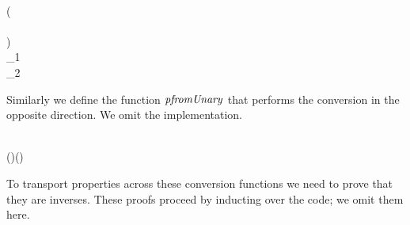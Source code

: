 \begin{hscode}
\\
\>[39]{}(\lambda {}\to {}\;\;\<[E]%
\\
\>[39]{}\<[42]%
\>[42]{}\;\<[51]%
\>[51]{}\to {}\;\<[E]%
\\
\>[39]{}\<[42]%
\>[42]{}\;\<[51]%
\>[51]{}\to {}\;){}\<[E]%
\\
\>[3]{}\<[5]%
\>[5]{}\;{}\<[12]%
\>[12]{}\;_1\;\mathrel{=}\;\;\<[E]%
\\
\>[12]{}\;_2\;\mathrel{=}\;\;\<[E]%
\ColumnHook
\end{hscode}\resethooks
Similarly we define the function \ensuremath{\Varid{pfromUnary}} that performs the conversion
in the opposite direction. We omit the implementation.
\begin{hscode}\SaveRestoreHook
{}%
%
%
%
\>[3]{}\mathbin{::}{}\<[E]%
\\
\>[3]{}\<[5]%
\>[5]{}(\mathbin{::})\to {}\;(\;\;)\;\to {}\;\;\<[E]%
\ColumnHook
\end{hscode}\resethooks
To transport properties across these conversion functions we need to prove
that they are inverses. These proofs proceed by inducting over the code;
we omit them here.

